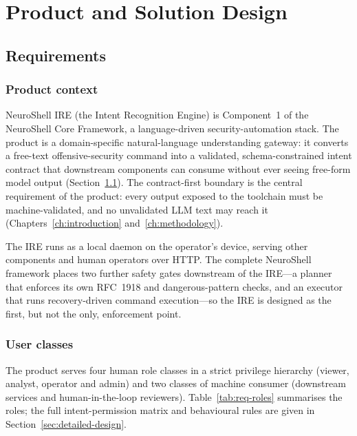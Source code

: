 \chapter{Product and Solution Design}\label{ch:product-design}

\section{Requirements}\label{sec:requirements}

\subsection*{Product context}

NeuroShell IRE (the Intent Recognition Engine) is Component~1 of the
NeuroShell Core Framework, a language-driven security-automation stack. The
product is a domain-specific natural-language understanding gateway: it
converts a free-text offensive-security command into a validated,
schema-constrained intent contract that downstream components can consume
without ever seeing free-form model output (Section~\ref{sec:requirements}).
The contract-first boundary is the central requirement of the product: every
output exposed to the toolchain must be machine-validated, and no unvalidated
LLM text may reach it (Chapters~\ref{ch:introduction} and~\ref{ch:methodology}).

The IRE runs as a local daemon on the operator's device, serving other
components and human operators over HTTP. The complete NeuroShell framework
places two further safety gates downstream of the IRE—a planner that enforces
its own RFC~1918 and dangerous-pattern checks, and an executor that runs
recovery-driven command execution—so the IRE is designed as the first, but not
the only, enforcement point.

\subsection*{User classes}

The product serves four human role classes in a strict privilege hierarchy
(viewer, analyst, operator and admin) and two classes of machine consumer
(downstream services and human-in-the-loop reviewers). Table~\ref{tab:req-roles}
summarises the roles; the full intent-permission matrix and behavioural rules
are given in Section~\ref{sec:detailed-design}.


